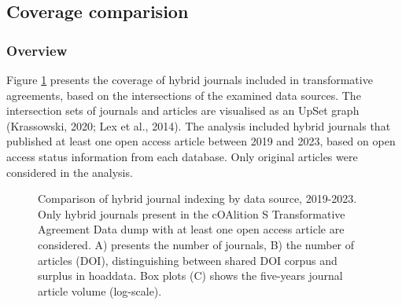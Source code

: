 \documentclass[a4paper,man,floatsintext,longtable,noextraspace,10pt]{apa6}
\begin{document}
\subsection{Coverage comparision}\label{coverage-comparision}

\subsubsection{Overview}\label{overview}

Figure \ref{fig-upset_coverage_results} presents the coverage of hybrid
journals included in transformative agreements, based on the
intersections of the examined data sources. The intersection sets of
journals and articles are visualised as an UpSet graph (Krassowski,
2020; Lex et al., 2014). The analysis included hybrid journals that
published at least one open access article between 2019 and 2023, based
on open access status information from each database. Only original
articles were considered in the analysis.

\begin{figure}[ht!]


\caption{\label{fig-upset_coverage_results}Comparison of hybrid journal
indexing by data source, 2019-2023. Only hybrid journals present in the
cOAlition S Transformative Agreement Data dump with at least one open
access article are considered. A) presents the number of journals, B)
the number of articles (DOI), distinguishing between shared DOI corpus
and surplus in hoaddata. Box plots (C) shows the five-years journal
article volume (log-scale).}

\end{figure}%
\end{document}
